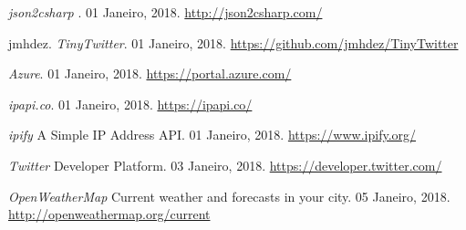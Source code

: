\documentclass[11pt]{report}
\begin{document}
\begin{thebibliography}{2}

	\emph{json2csharp }.  01 Janeiro, 2018. 
	\url{http://json2csharp.com/}


	jmhdez. \emph{TinyTwitter}.  01 Janeiro, 2018. 
	\url{https://github.com/jmhdez/TinyTwitter}


	\emph{Azure}.  01 Janeiro, 2018. 
	\url{https://portal.azure.com/}


	\emph{ipapi.co}.  01 Janeiro, 2018. 
	\url{https://ipapi.co/}


	\emph{ipify} A Simple IP Address API.  01 Janeiro, 2018. 
	\url{https://www.ipify.org/}


	\emph{Twitter} Developer Platform.  03 Janeiro, 2018. 
	\url{https://developer.twitter.com/}


	\emph{OpenWeatherMap} Current weather and forecasts in your city.  05 Janeiro, 2018. 
	\url{http://openweathermap.org/current}
	

\end{thebibliography}
\end{document}
